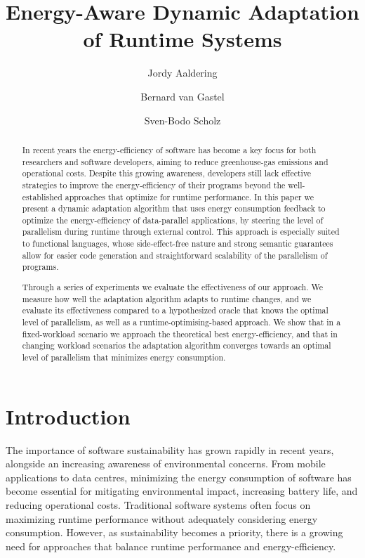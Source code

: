 \documentclass[runningheads]{llncs}
\title{Energy-Aware Dynamic Adaptation of Runtime Systems}
\author{Jordy Aaldering\orcidlink{0009-0001-3018-5152}
  \and Bernard van Gastel\orcidlink{0000-0002-0974-4634}
  \and Sven-Bodo Scholz\orcidlink{0000-0002-8663-1043}}
\institute{Radboud University, Nijmegen, Netherlands \\
  \email{\{jordy.aaldering,bernard.vangastel,svenbodo.scholz\}@ru.nl}}
\begin{document}
\maketitle

\begin{abstract}
In recent years the energy-efficiency of software has become a key focus for both researchers and software developers, aiming to reduce greenhouse-gas emissions and operational costs.
Despite this growing awareness, developers still lack effective strategies to improve the energy-efficiency of their programs beyond the well-established approaches that optimize for runtime performance.
In this paper we present a dynamic adaptation algorithm that uses energy consumption feedback to optimize the energy-efficiency of data-parallel applications, by steering the level of parallelism during runtime through external control.
This approach is especially suited to functional languages, whose side-effect-free nature and strong semantic guarantees allow for easier code generation and straightforward scalability of the parallelism of programs.

Through a series of experiments we evaluate the effectiveness of our approach.
We measure how well the adaptation algorithm adapts to runtime changes, and we evaluate its effectiveness compared to a hypothesized oracle that knows the optimal level of parallelism, as well as a runtime-optimising-based approach.
We show that in a fixed-workload scenario we approach the theoretical best energy-efficiency, and that in changing workload scenarios the adaptation algorithm converges towards an optimal level of parallelism that minimizes energy consumption.

\end{abstract}

\section{Introduction}
The importance of software sustainability has grown rapidly in recent years, alongside an increasing awareness of environmental concerns.
From mobile applications to data centres, minimizing the energy consumption of software has become essential for mitigating environmental impact, increasing battery life, and reducing operational costs.
Traditional software systems often focus on maximizing runtime performance without adequately considering energy consumption.
However, as sustainability becomes a priority, there is a growing need for approaches that balance runtime performance and energy-efficiency.
\end{document}
